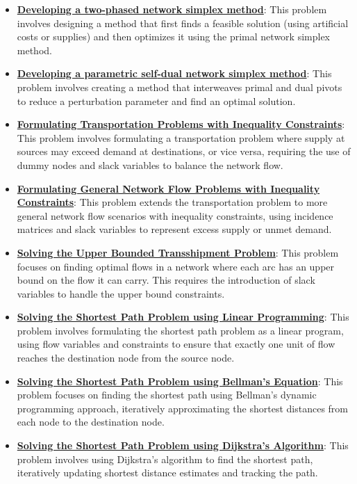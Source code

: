 \documentclass{article}%
\begin{document}
\begin{itemize}[leftmargin=*]
\item \href{https://www.math.purdue.edu/~yipn/421/2024-11-07-NetSimplex.pdf#page=45}{\textbf{Developing a two{-}phased network simplex method}}: This problem involves designing a method that first finds a feasible solution (using artificial costs or supplies) and then optimizes it using the primal network simplex method.%
\item \href{https://www.math.purdue.edu/~yipn/421/2024-11-07-NetSimplex.pdf#page=45}{\textbf{Developing a parametric self{-}dual network simplex method}}: This problem involves creating a method that interweaves primal and dual pivots to reduce a perturbation parameter and find an optimal solution.%
\end{itemize}%
\begin{itemize}[leftmargin=*]%
\item \href{https://www.math.purdue.edu/~yipn/421/2024-11-14-NetAppls.pdf#page=2}{\textbf{Formulating Transportation Problems with Inequality Constraints}}: This problem involves formulating a transportation problem where supply at sources may exceed demand at destinations, or vice versa, requiring the use of dummy nodes and slack variables to balance the network flow.%
\item \href{https://www.math.purdue.edu/~yipn/421/2024-11-14-NetAppls.pdf#page=7}{\textbf{Formulating General Network Flow Problems with Inequality Constraints}}: This problem extends the transportation problem to more general network flow scenarios with inequality constraints, using incidence matrices and slack variables to represent excess supply or unmet demand.%
\item \href{https://www.math.purdue.edu/~yipn/421/2024-11-14-NetAppls.pdf#page=9}{\textbf{Solving the Upper Bounded Transshipment Problem}}: This problem focuses on finding optimal flows in a network where each arc has an upper bound on the flow it can carry. This requires the introduction of slack variables to handle the upper bound constraints.%
\item \href{https://www.math.purdue.edu/~yipn/421/2024-11-14-NetAppls.pdf#page=13}{\textbf{Solving the Shortest Path Problem using Linear Programming}}: This problem involves formulating the shortest path problem as a linear program, using flow variables and constraints to ensure that exactly one unit of flow reaches the destination node from the source node.%
\item \href{https://www.math.purdue.edu/~yipn/421/2024-11-14-NetAppls.pdf#page=16}{\textbf{Solving the Shortest Path Problem using Bellman's Equation}}: This problem focuses on finding the shortest path using Bellman's dynamic programming approach, iteratively approximating the shortest distances from each node to the destination node.%
\item \href{https://www.math.purdue.edu/~yipn/421/2024-11-14-NetAppls.pdf#page=20}{\textbf{Solving the Shortest Path Problem using Dijkstra's Algorithm}}: This problem involves using Dijkstra's algorithm to find the shortest path, iteratively updating shortest distance estimates and tracking the path.%
\end{itemize}%
\end{document}

